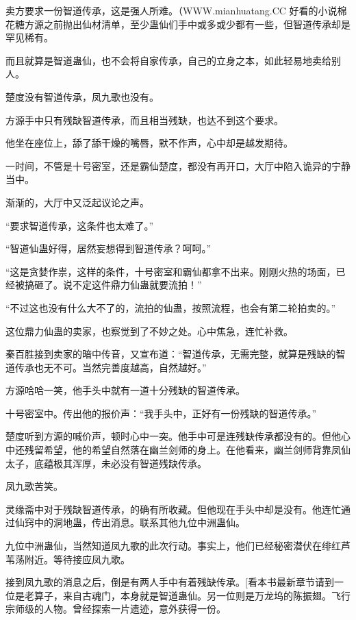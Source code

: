 
\begin{this_body}

卖方要求一份智道传承，这是强人所难。（WWW.mianhuatang.CC 好看的小说棉花糖方源之前抛出仙材清单，至少蛊仙们手中或多或少都有一些，但智道传承却是罕见稀有。

而且就算是智道蛊仙，也不会将自家传承，自己的立身之本，如此轻易地卖给别人。

楚度没有智道传承，凤九歌也没有。

方源手中只有残缺智道传承，而且相当残缺，也达不到这个要求。

他坐在座位上，舔了舔干燥的嘴唇，默不作声，心中却是越发期待。

一时间，不管是十号密室，还是霸仙楚度，都没有再开口，大厅中陷入诡异的宁静当中。

渐渐的，大厅中又泛起议论之声。

“要求智道传承，这条件也太难了。”

“智道仙蛊好得，居然妄想得到智道传承？呵呵。”

“这是贪婪作祟，这样的条件，十号密室和霸仙都拿不出来。刚刚火热的场面，已经被搞砸了。说不定这件鼎力仙蛊就要流拍！”

“不过这也没有什么大不了的，流拍的仙蛊，按照流程，也会有第二轮拍卖的。”

这位鼎力仙蛊的卖家，也察觉到了不妙之处。心中焦急，连忙补救。

秦百胜接到卖家的暗中传音，又宣布道：“智道传承，无需完整，就算是残缺的智道传承也无不可。当然完善度越高，自然越好。”

方源哈哈一笑，他手头中就有一道十分残缺的智道传承。

十号密室中。传出他的报价声：“我手头中，正好有一份残缺的智道传承。”

楚度听到方源的喊价声，顿时心中一突。他手中可是连残缺传承都没有的。但他心中还残留希望，他的希望自然落在幽兰剑师的身上。在他看来，幽兰剑师背靠凤仙太子，底蕴极其浑厚，未必没有智道残缺传承。

凤九歌苦笑。

灵缘斋中对于残缺智道传承，的确有所收藏。但他现在手头中却是没有。他连忙通过仙窍中的洞地蛊，传出消息。联系其他九位中洲蛊仙。

九位中洲蛊仙，当然知道凤九歌的此次行动。事实上，他们已经秘密潜伏在绯红芦苇荡附近。等待接应凤九歌。

接到凤九歌的消息之后，倒是有两人手中有着残缺传承。[看本书最新章节请到一位是老算子，来自古魂门，本身就是智道蛊仙。另一位则是万龙坞的陈振翅。飞行宗师级的人物。曾经探索一片遗迹，意外获得一份。


\end{this_body}
